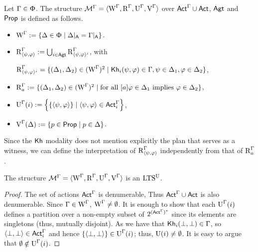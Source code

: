 \begin{definition}\label{def:cm-ults-khiml}
Let $\Gamma \in \Upphi$. The structure $\mathcal{M}^\Gamma=\langle \operatorname{W}^\Gamma, \operatorname{R}^\Gamma, \operatorname{U}^\Gamma, \operatorname{V}^\Gamma \rangle$ over ${\rm \sf Act}^\Gamma \cup {\rm \sf Act}$, ${\rm \sf Agt}$ and ${\rm \sf Prop}$ is defined as follows.
\begin{itemize}
\item $\operatorname{W}^\Gamma := \{ \Delta \in \Upphi \mid \Delta\vert_{{\sf A}} = \Gamma\vert_{{\sf A}} \}$.

\item $\operatorname{R}^{\Gamma}_{\langle \psi,\varphi \rangle} := \bigcup_{i \in {\rm \sf Agt}} \operatorname{R}^{\Gamma} _{\langle \psi,\varphi \rangle^i}$, with
\begin{center}
$\operatorname{R}^{\Gamma}_{\langle \psi,\varphi \rangle^i} = \{ (\Delta_1, \Delta_2) \in (\operatorname{W}^\Gamma)^2 \mid {\sf Kh}_i(\psi,\varphi) \in \Gamma, \psi \in \Delta_1, \varphi \in \Delta_2 \}$,
\end{center}

\item $\operatorname{R}^{\Gamma}_a := \{ (\Delta_1, \Delta_2) \in (\operatorname{W}^\Gamma)^2 \mid \text{for all } [a]\varphi \in \Delta_1 \text{ implies } \varphi \in \Delta_2 \}$,

\item $\operatorname{U}^\Gamma(i) := \left\{ \{ \langle \psi,\varphi \rangle \} \mid \langle \psi,\varphi \rangle \in {\rm \sf Act}^\Gamma_i \right\}$,

\item $\operatorname{V}^\Gamma(\Delta) := \{ p \in {\rm \sf Prop} \mid p \in \Delta \}$.
\end{itemize}
\end{definition}

\medskip
Since the ${\sf Kh}$ modality does not mention explicitly the plan that serves as a witness, we can define the interpretation of $\operatorname{R}^{\Gamma}_{\langle \psi,\varphi \rangle}$ independently from that of $\operatorname{R}^{\Gamma}_a$.
\medskip


\begin{proposition}\label{pro:cm-ults-khiml}
The structure $\mathcal{M}^\Gamma = \langle \operatorname{W}^\Gamma, \operatorname{R}^\Gamma, \operatorname{U}^\Gamma, \operatorname{V}^\Gamma \rangle$ is an $\textup{LTS$^\text{\textup{U}}$}$.
\end{proposition}
\begin{proof}
The set of actions ${\rm \sf Act}^\Gamma$ is denumerable, Thus ${\rm \sf Act}^\Gamma\cup{\rm \sf Act}$ is also denumerable.
Since $\Gamma \in \operatorname{W}^\Gamma$, $\operatorname{W}^\Gamma \neq \emptyset$.
It is enough to show that each $\operatorname{U}^\Gamma(i)$ defines a partition over a non-empty subset of $2^{({\rm \sf Act}^\Gamma)^*}$ since its elements are singletons (thus, mutually disjoint).
As we have that ${\sf Kh}_i(\bot,\bot) \in \Gamma$, so $\langle \bot, \bot \rangle \in {\rm \sf Act}^\Gamma_i$ and hence $\{ \langle \bot, \bot \rangle \} \in \operatorname{U}^\Gamma(i)$; thus, $\operatorname{U}(i) \neq \emptyset$.
It is easy to argue that $\emptyset \notin \operatorname{U}^\Gamma(i)$.
\end{proof}


